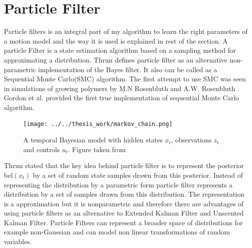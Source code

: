 \documentclass[12pt]{dalcsthesis}
\begin{document}
\section{Particle Filter}
Particle filters is an integral part of my algorithm to learn the right parameters of a motion model and the way it is used is explained in rest of the section. A particle Filter is a state estimation algorithm based on a sampling method for approximating a distribution. Thrun \cite{thrun2005probabilistic} defines particle filter as an alternative non-parametric implementation of the Bayes filter. It also can be called as a Sequential Monte Carlo(SMC) algorithm. The first attempt to use SMC was seen in simulations of growing polymers by M.N Rosenbluth and A.W. Rosenbluth \cite{rosenbluth1955monte}. Gordon et al. \cite{gordon1993novel} provided the first true implementation of sequential Monte Carlo algorithm. 

\begin{figure}
  \centering
     {\texttt{[image: ../../thesis\_work/markov\_chain.png]}}
  \caption{\label{fig-Markov Chain} A temporal Bayesian model with hidden states $x_{t}$, observations $z_{t}$ and controls $u_{t}$. Figure taken from \cite{thrun2005probabilistic}}
\end{figure}

Thrun \cite{thrun2005probabilistic} stated that the key idea behind particle filter is to represent the posterior bel$(x_{t})$ by a set of random state samples drawn from this posterior. Instead of representing the distribution by a parametric form particle filter represents a distribution by a set of samples drawn from this distribution. 	The representation is a approximation but it is nonparametric and therefore there are advantages of using particle filters as an alternative to Extended Kalman Filter and Unscented Kalman Filter. Particle Filters can represent a broader space of distributions for example non-Gaussian and can model non linear transformations of random variables. 

	
\end{document}
